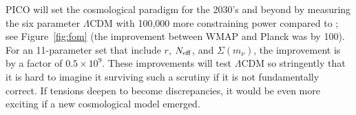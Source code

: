 \documentclass[PICOAPC.tex]{subfiles}
\begin{document}
PICO will set the cosmological paradigm for the 2030's and beyond by measuring the six parameter $\Lambda$CDM with 100,000 more constraining power compared to \planck ; see Figure~\ref{fig:fom} (the improvement between WMAP and Planck was by 100). For an 11-parameter set that include $r$, ${N_{\rm eff}}$, and $\Sigma (m_{\nu})$, the improvement is by a factor of $0.5\times10^{9}$. These improvements will test $\Lambda$CDM so stringently that it is hard to imagine it surviving such a scrutiny if it is not fundamentally correct. If tensions deepen to become discrepancies, it would be even more exciting if a new cosmological model emerged. 


\end{document}
